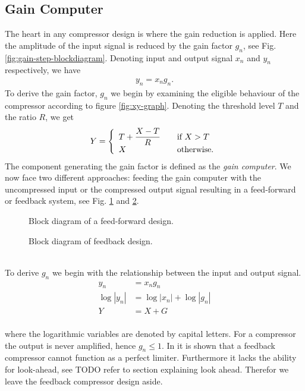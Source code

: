 \documentclass[../main2.tex]{subfiles}
\begin{document}
\subsection{Gain Computer}
The heart in any compressor design is where the gain reduction is applied. Here the amplitude of the input signal is reduced by the gain factor $g_n$, see Fig. \ref{fig:gain-step-blockdiagram}. Denoting input and output signal $x_n$ and $y_n$ respectively, we have
\begin{align}
y_n = x_n g_n.
\label{eq:inout}
\end{align}
To derive the gain factor, $g_n$ we begin by examining the eligible behaviour of the compressor according to figure \ref{fig:xy-graph}. Denoting the threshold level $T$ and the ratio $R$, we get
\begin{equation} \label{eq:gaincomp}
Y = \left\{ 
  \begin{array}{l l}
    T+ \dfrac{X-T}{R} & \quad \text{if $X > T$}\\
    X & \quad \text{otherwise.}
  \end{array} \right.
\end{equation}
The component generating the gain factor is defined as the \emph{gain computer}. We now face two different approaches: feeding the gain computer with the uncompressed input or the compressed output signal resulting in a feed-forward or feedback system, see Fig. \ref{fig:feedforward-blockdiagram} and \ref{fig:feedback-blockdiagram}. 
\begin{figure}[ht]
 \centering

\caption{Block diagram of a feed-forward design.}
\label{fig:feedforward-blockdiagram}
\end{figure}
\begin{figure}[ht]
\centering

\caption{Block diagram of feedback design.} 
\label{fig:feedback-blockdiagram}
\end{figure}
\\ To derive $g_n$ we begin with the relationship between the input and output signal.
\begin{align}
y_n &= x_ng_n   \\
\log|y_n| & = \log|x_n| + \log|g_n|   \\
Y &= X + G \label{eq:cv}
\end{align}
\\ where the logarithmic variables are denoted by capital letters. For a compressor the output is never amplified, hence $g_n \leq 1$. In \cite{giannoullis} it is shown that a feedback compressor cannot function as a perfect limiter. Furthermore it lacks the ability for look-ahead, see TODO refer to section explaining look ahead. Therefor we leave the feedback compressor design aside. 
\end{document}
